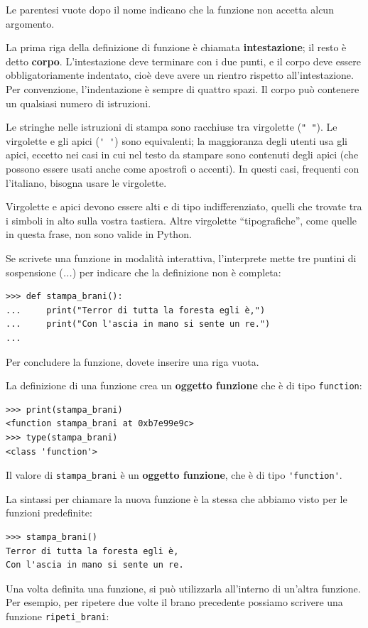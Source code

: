 \documentclass[10pt]{book}
\begin{document}
Le parentesi vuote dopo il nome indicano che la funzione non accetta alcun argomento.

La prima riga della definizione di funzione è chiamata {\bf intestazione};
il resto è detto {\bf corpo}. L'intestazione deve terminare con i due punti, e il corpo deve essere obbligatoriamente indentato, cioè deve avere un rientro rispetto all'intestazione. Per convenzione, l'indentazione è sempre di quattro spazi. Il corpo può contenere un qualsiasi numero di istruzioni.

Le stringhe nelle istruzioni di stampa sono racchiuse tra virgolette (\verb'" "'). Le virgolette e gli apici (\verb"' '") sono equivalenti; la maggioranza degli utenti usa gli apici, eccetto nei casi in cui nel testo da stampare sono contenuti degli apici (che possono essere usati anche come apostrofi o accenti). In questi casi, frequenti con l'italiano, bisogna usare le virgolette.

Virgolette e apici devono essere alti e di tipo indifferenziato, quelli che trovate tra i simboli in alto sulla vostra tastiera.  Altre virgolette ``tipografiche'', come quelle in questa frase, non sono valide in Python.

Se scrivete una funzione in modalità interattiva, l'interprete mette tre puntini di sospensione ({\em ...}) per indicare che la definizione non è completa:

\begin{verbatim}
>>> def stampa_brani():
...     print("Terror di tutta la foresta egli è,")
...     print("Con l'ascia in mano si sente un re.")
...
\end{verbatim}
%
Per concludere la funzione, dovete inserire una riga vuota.

La definizione di una funzione crea un {\bf oggetto funzione} che è di tipo \verb"function":

\begin{verbatim}
>>> print(stampa_brani)
<function stampa_brani at 0xb7e99e9c>
>>> type(stampa_brani)
<class 'function'>
\end{verbatim}
%
Il valore di \verb"stampa_brani" è un {\bf oggetto funzione}, che è di tipo \verb"'function'".

La sintassi per chiamare la nuova funzione è la stessa che abbiamo visto per le funzioni predefinite:

\begin{verbatim}
>>> stampa_brani()
Terror di tutta la foresta egli è,
Con l'ascia in mano si sente un re.
\end{verbatim}
%
Una volta definita una funzione, si può utilizzarla all'interno di un'altra funzione. Per esempio, per ripetere due volte il brano precedente possiamo scrivere una funzione \verb"ripeti_brani":
\end{document}
